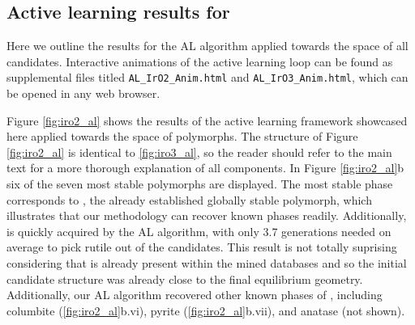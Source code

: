 \subsection{Active learning results for \IrOtwo}

%
%
Here we outline the results for the AL algorithm applied towards the space of all \IrOtwo candidates.
%
Interactive animations of the active learning loop can be found as supplemental files titled
\texttt{AL\_IrO2\_Anim.html}
and
\texttt{AL\_IrO3\_Anim.html},
which can be opened in any web browser.


%
Figure \ref{fig:iro2_al} shows the results of the active learning framework showcased here applied towards the space of \IrOtwo polymorphs.
%
The structure of Figure \ref{fig:iro2_al} is identical to \ref{fig:iro3_al},
so the reader should refer to the main text for a more thorough explanation of all components.
%
In Figure \ref{fig:iro2_al}b six of the seven most stable \IrOtwo polymorphs are displayed.
%
The most stable phase corresponds to \rIrOtwo, the already established globally stable \IrOtwo polymorph,
which illustrates that our methodology can recover known phases readily.
%
Additionally, \rIrOtwo is quickly acquired by the AL algorithm,
with only \num{3.7} generations needed on average to pick rutile out of the candidates.
%
This result is not totally suprising considering that \rIrOtwo is already present within the mined databases and so the initial candidate structure was already close to the final equilibrium geometry.
%
Additionally, our AL algorithm recovered other known phases of \IrOtwo, including columbite (\ref{fig:iro2_al}b.vi), pyrite (\ref{fig:iro2_al}b.vii), and anatase (not shown).


